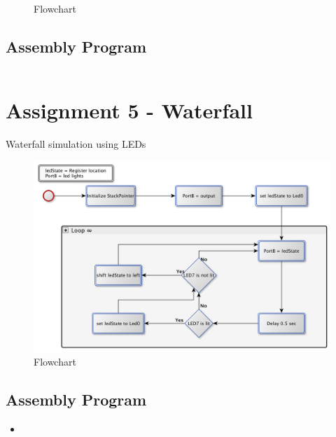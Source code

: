 \documentclass[a4paper, 12pt]{article}
\newcommand{\avrasm}[2]{
\begin{itemize}
\item[]
\end{itemize}
}
\begin{document}
\begin{figure}[h]

\caption{Flowchart}
\label{}
\end{figure}

\subsection{Assembly Program}
\begin{lstlisting}

\end{lstlisting}
\newpage

\section{Assignment 5 - Waterfall}
\begin{algorithm}
\begin{algorithmic}
 
\Repeat
{}
\EndIf
{}
\EndIf
\Until{$\infty$}
\EndProcedure
\caption{Waterfall simulation using LEDs}
\label{}
\end{algorithmic}
\end{algorithm}

\begin{figure}[h]
\includegraphics[scale=0.5]{Flowchart_pics/assignment5_pic.png} 
\caption{Flowchart}
\label{}
\end{figure}
\newpage
\subsection{Assembly Program}
\avrasm{../src/a5.asm}{}
\newpage
\end{document}
